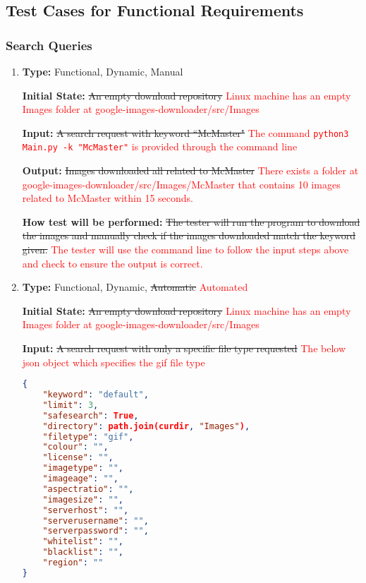 \documentclass[12pt, titlepage]{article}
\begin{document}
	
\subsection{Test Cases for Functional Requirements}


\subsubsection{Search Queries}

\begin{enumerate}[label=FR-SQ\arabic*:, wide=0pt, leftmargin=*]

\item \phantom{empty}

\textbf{Type:} Functional, Dynamic, Manual

\textbf{Initial State:} \sout{An empty download repository} 
\textcolor{red}{Linux machine has an empty Images folder at google-images-downloader/src/Images}

\textbf{Input:} \sout{A search request with keyword ``McMaster"} 
\textcolor{red}{The command \texttt{python3 Main.py -k "McMaster"} is provided through the command line}

\textbf{Output:} \sout{Images downloaded all related to McMaster}
\textcolor{red}{There exists a folder at google-images-downloader/src/Images/McMaster that contains
10 images related to McMaster within 15 seconds.}

\textbf{How test will be performed:} \sout{The tester will run the program to download the images and manually check if the images downloaded match the keyword given.}
\textcolor{red}{The tester will use the command line to follow the input steps above and check to ensure the output is correct.}

\item \phantom{empty}

\textbf{Type:} Functional, Dynamic, \sout{Automatic} \textcolor{red}{Automated}
					
\textbf{Initial State:} \sout{An empty download repository}
\textcolor{red}{Linux machine has an empty Images folder at google-images-downloader/src/Images}
					
\textbf{Input:} \sout{A search request with only a specific file type requested}
\textcolor{red}{The below json object which specifies the gif file type}
\begin{lstlisting}[language=json,firstnumber=1]
{
	"keyword": "default",
	"limit": 3,
	"safesearch": True,
	"directory": path.join(curdir, "Images"),
	"filetype": "gif",
	"colour": "",
	"license": "",
	"imagetype": "",
	"imageage": "",
	"aspectratio": "",
	"imagesize": "",
	"serverhost": "",
	"serverusername": "",
	"serverpassword": "",
	"whitelist": "",
	"blacklist": "",
	"region": ""
}
\end{lstlisting}
					

\end{enumerate}
\end{document}
